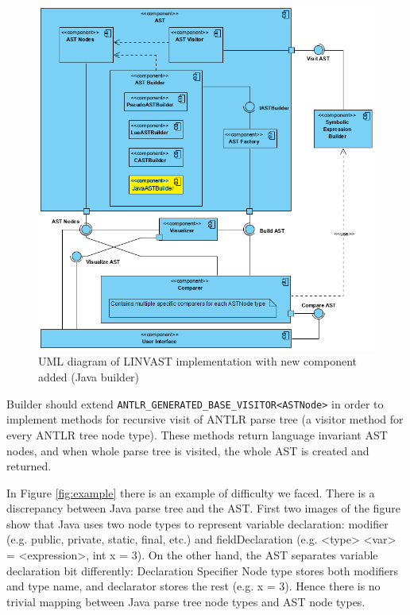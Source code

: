 \documentclass[a4paper]{article}
\begin{document}
\begin{figure}[h!]
\includegraphics[width=\textwidth]{UML_with_Java_builder_added.png}
\caption{UML diagram of LINVAST implementation with new component added (Java builder)}
\label{fig:UML}
\end{figure}

Builder should extend \texttt{ANTLR\_GENERATED\_BASE\_VISITOR<ASTNode>} in order to implement methods for recursive visit of ANTLR parse tree (a visitor method for every ANTLR tree node type). These methods return language invariant AST nodes, and when whole parse tree is visited, the whole AST is created and returned.

In Figure \ref{fig:example} there is an example of difficulty we faced. There is a discrepancy between Java parse tree and the AST. First two images of the figure show that Java uses two node types to represent variable declaration: modifier (e.g. public, private, static, final, etc.) and fieldDeclaration (e.g. <type> <var> = <expression>, int x = 3). On the other hand, the AST separates variable declaration bit differently: Declaration Specifier Node type stores both modifiers and type name, and declarator stores the rest (e.g. x = 3). Hence there is no trivial mapping between Java parse tree node types and AST node types.
\end{document}
